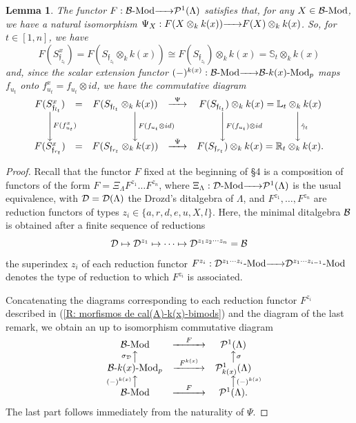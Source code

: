 \documentclass{article}
\newtheorem{lemma}[theorem]{Lemma}
\theoremstyle{definition}
\newcommand{\Mod}{{ \rm Mod }}
\renewcommand{\frak}{\mathfrak}
\newcommand{\g}{\hbox{-}}
\newcommand{\hueca}[1]{\mathbb{#1}}
\newcommand{\rightmap}[1]{\smash{\mathop{\hbox to 
20pt{\rightarrowfill}}\limits^{#1}}}
\newcommand{\rmapdown}[1]{\Bigg\downarrow\rlap{$\vcenter{\hbox{$\scriptstyle#1$}
}$}}
\newcommand{\shortlmapup}[1]
{\llap{$\vcenter{\hbox{$\scriptstyle#1$}}$}\big\uparrow}
\newcommand{\shortrmapup}[1]
{\big\uparrow\rlap{$\vcenter{\hbox{$\scriptstyle#1$}}$}}
\begin{document}
\begin{lemma}\label{L: F conmuta con otimes k(x)} The functor $F:{\cal B}\g\Mod\rightmap{}{\cal P}^1(\Lambda)$ satisfies that, for any $X\in {\cal B}\g\Mod$, we have  a natural isomorphism 
$\Psi_X:F(X\otimes_kk(x))\rightmap{} F(X)\otimes_k k(x)$.  
So, for $t\in [1,n]$, we have 
$$
F(S_{\frak{f}_{z_t}}^x)= F(S_{\frak{f}_{z_t}}\otimes_kk(x))\cong F(S_{\frak{f}_{z_t}})\otimes_kk(x)=\hueca{S}_t\otimes_kk(x)$$
and, since the scalar extension functor 
$(-)^{k(x)}:{\cal B}\g\Mod\rightmap{}
{\cal B}\g{k(x)}\g\Mod_p$ maps $f_{u_t}$ onto  $f^x_{u_t}=f_{u_t}\otimes id$, we have the commutative diagram   
$$\begin{matrix}
F(S_{\frak{f}_{l_t}}^x)&=&F(S_{\frak{f}_{l_t}}\otimes_kk(x))&\rightmap{\Psi}&F(S_{\frak{f}_{l_t}})\otimes_kk(x)=\hueca{L}_t\otimes_kk(x)\\
\rmapdown{F(f^x_{u_t})}&&\hbox{ \hskip.6cm }\rmapdown{F(f_{u_t}\otimes id)}&&\rmapdown{F(f_{u_t})\otimes id}\hbox{\hskip 2.5cm}\rmapdown{\hat{\gamma}_t}\\
F(S_{\frak{f}_{r_t}}^x)&=&F(S_{\frak{f}_{r_t}}\otimes_kk(x))&\rightmap{\Psi}&F(S_{\frak{f}_{r_t}})\otimes_kk(x)=\hueca{R}_t\otimes_kk(x).\\
\end{matrix}$$
\end{lemma}

\begin{proof} Recall that the functor $F$ fixed at the beginning of \S4 is a composition of functors of the form $F=\Xi_\Lambda F^{z_1}\ldots F^{z_n}$, where $\Xi_\Lambda:{\cal D}\g\Mod\rightmap{}{\cal P}^1(\Lambda)$ is the usual equivalence, with ${\cal D}={\cal D}(\Lambda)$ the Drozd's ditalgebra of $\Lambda$, and $F^{z_1},\ldots,F^{z_n}$ are reduction functors of types $z_i\in \{a,r,d,e,u,X,l\}$. Here, 
the minimal ditalgebra ${\cal B}$ is obtained 
after a finite sequence of reductions 
$${\cal D}\mapsto {\cal D}^{z_1}\mapsto\cdots\mapsto {\cal D}^{z_1z_2\cdots z_n}={\cal B}$$
the superindex $z_i$ of each reduction functor $F^{z_i}:{\cal D}^{z_1\cdots z_i}\g\Mod\rightmap{}{\cal D}^{z_1\cdots z_{i-1}}\g\Mod$   denotes the type of reduction to which $F^{z_i}$ is associated.   

Concatenating the diagrams corresponding to each reduction functor $F^{z_i}$ described in (\ref{R: morfismos de cal(A)-k(x)-bimods}) and the diagram of the last remark, we obtain an up to isomorphism commutative diagram 
$$\begin{matrix}
{\cal B}\g\Mod&
\rightmap{\hbox{\hskip.5cm}  F \hbox{\hskip.5cm}}&{\cal P}^1(\Lambda)\\
\shortlmapup{\sigma_{\cal D}}&&\shortrmapup{\sigma}\\
{\cal B}\g k(x)\g\Mod_p&\rightmap{ \ \ F^{k(x)} \ \ }&{\cal P}_{k(x)}^1(\Lambda)\\
\shortlmapup{(-)^{k(x)}}&&\shortrmapup{(-)^{k(x)}}\\
{\cal B}\g\Mod&
\rightmap{ \hbox{\hskip.5cm}  F \hbox{\hskip.5cm}}&{\cal P}^1(\Lambda).\\
\end{matrix}$$
The last part follows immediately from the naturality of $\Psi$. 
\end{proof}
\end{document}
